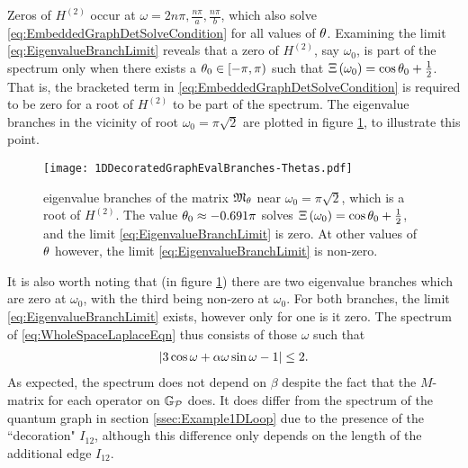 Zeros of $H^{(2)}$ occur at $\omega= 2n\pi, \frac{n\pi}{a}, \frac{n\pi}{b}$, which also solve \eqref{eq:EmbeddedGraphDetSolveCondition} for all values of $\theta$.
Examining the limit \eqref{eq:EigenvalueBranchLimit} reveals that a zero of $H^{(2)}$, say $\omega_0$, is part of the spectrum only when there exists a $\theta_0\in\left[-\pi,\pi\right)$ such that $\Xi\left( \omega_0 \right)=\cos\theta_0+\frac{1}{2}$.
That is, the bracketed term in \eqref{eq:EmbeddedGraphDetSolveCondition} is required to be zero for a root of $H^{(2)}$ to be part of the spectrum.
The eigenvalue branches in the vicinity of root $\omega_0=\pi\sqrt{2}$ are plotted in figure \ref{fig:1DDecoratedGraphEvalBranches-Thetas}, to illustrate this point.
\begin{figure}[t!]
	\centering
	\texttt{[image: 1DDecoratedGraphEvalBranches-Thetas.pdf]}
	\caption{\label{fig:1DDecoratedGraphEvalBranches-Thetas} eigenvalue branches of the matrix $\mathfrak{M}_{\theta}$ near $\omega_0 = \pi\sqrt{2}$, which is a root of $H^{(2)}$. The value $\theta_0\approx-0.691\pi$ solves $\Xi\left( \omega_0 \right)=\cos\theta_0+\frac{1}{2}$, and the limit \eqref{eq:EigenvalueBranchLimit} is zero. At other values of $\theta$ however, the limit \eqref{eq:EigenvalueBranchLimit} is non-zero.}
\end{figure}
It is also worth noting that (in figure \ref{fig:1DDecoratedGraphEvalBranches-Thetas}) there are two eigenvalue branches which are zero at $\omega_0$, with the third being non-zero at $\omega_0$.
For both branches, the limit \eqref{eq:EigenvalueBranchLimit} exists, however only for one is it zero.
The spectrum of \eqref{eq:WholeSpaceLaplaceEqn} thus consists of those $\omega$ such that
\begin{align*}
	\left\lvert  3\cos\omega + \alpha\omega\sin\omega - 1  \right\rvert \leq 2.
\end{align*}
As expected, the spectrum does not depend on $\beta$ despite the fact that the $M$-matrix for each operator on $\mathbb{G}_{\mathcal{P}}$ does.
It does differ from the spectrum of the quantum graph in section \ref{ssec:Example1DLoop} due to the presence of the ``decoration" $I_{12}$, although this difference only depends on the length of the additional edge $I_{12}$.

